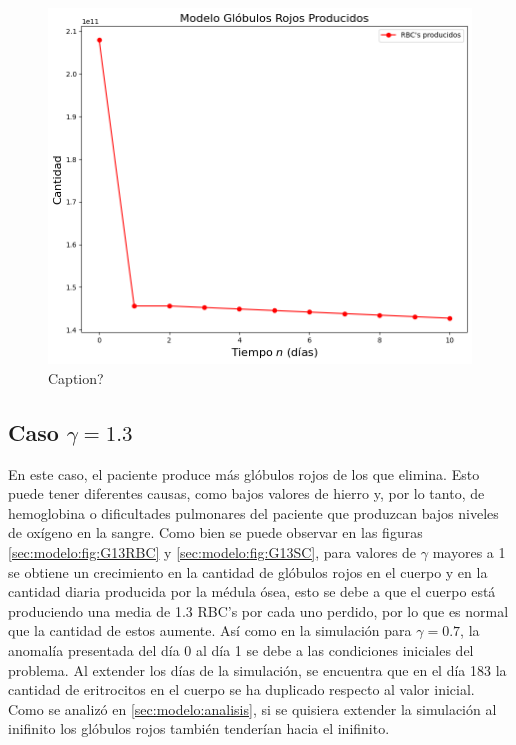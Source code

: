 \begin{figure}[h]
    \centering
    \includegraphics[scale=0.6]{figures/BaseG07SC.png}
    \caption{Caption?}
    \label{sec:modelo:fig:G07SC}
\end{figure}

\FloatBarrier

\subsection{Caso $\gamma=1.3$}

En este caso, el paciente produce más glóbulos rojos de los que elimina. Esto puede tener diferentes causas, como bajos valores de hierro y, por lo tanto, de hemoglobina o dificultades pulmonares del paciente que produzcan bajos niveles de oxígeno en la sangre. Como bien se puede observar en las figuras \ref{sec:modelo:fig:G13RBC} y \ref{sec:modelo:fig:G13SC}, para valores de $\gamma$ mayores a 1 se obtiene un crecimiento en la cantidad de glóbulos rojos en el cuerpo y en la cantidad diaria producida por la médula ósea, esto se debe a que el cuerpo está produciendo una media de 1.3 RBC's por cada uno perdido, por lo que es normal que la cantidad de estos aumente. Así como en la simulación para $\gamma = 0.7$, la anomalía presentada del día 0 al día 1 se debe a las condiciones iniciales del problema. Al extender los días de la simulación, se encuentra que en el día 183 la cantidad de eritrocitos en el cuerpo se ha duplicado respecto al valor inicial. Como se analizó en \ref{sec:modelo:analisis}, si se quisiera extender la simulación al inifinito los glóbulos rojos también tenderían hacia el inifinito. 

